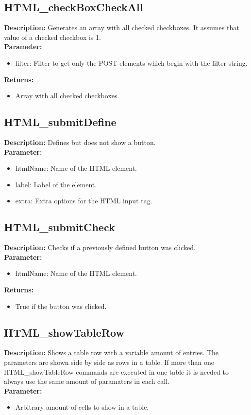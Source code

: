 \subsection{HTML\_checkBoxCheckAll}
\textbf{Description:} Generates an array with all checked checkboxes. It assumes that value of a checked checkbox is 1.\\
\textbf{Parameter:}
\begin{itemize}
\item filter: Filter to get only the POST elements which begin with the filter string.
\end{itemize}
\textbf{Returns:}
\begin{itemize}
\item Array with all checked checkboxes.
\end{itemize}

\subsection{HTML\_submitDefine}
\textbf{Description:} Defines but does not show a button.\\
\textbf{Parameter:}
\begin{itemize}
\item htmlName: Name of the HTML element.
\item label: Label of the element.
\item extra: Extra options for the HTML input tag.
\end{itemize}

\subsection{HTML\_submitCheck}
\textbf{Description:} Checks if a previously defined button was clicked.\\
\textbf{Parameter:}
\begin{itemize}
\item htmlName: Name of the HTML element.
\end{itemize}
\textbf{Returns:}
\begin{itemize}
\item True if the button was clicked.
\end{itemize}

\subsection{HTML\_showTableRow}
\textbf{Description:} Shows a table row with a variable amount of entries. The parameters are shown side by side as rows in a table. If more than one HTML\_showTableRow commands are executed in one table it is needed to always use the same amount of paramaters in each call.\\
\textbf{Parameter:}
\begin{itemize}
\item Arbitrary amount of cells to show in a table.
\end{itemize}

